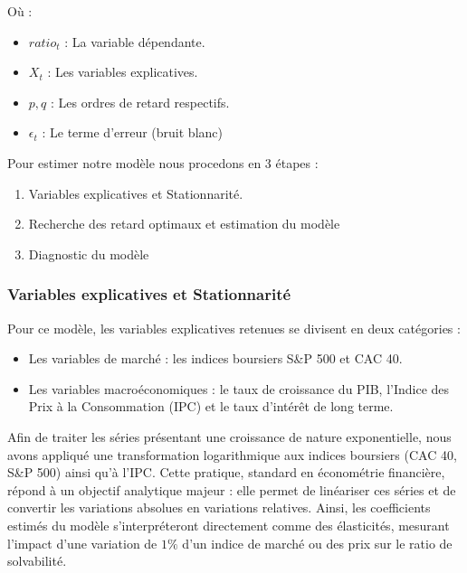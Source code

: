 \documentclass[
]{article}
\providecommand{\tightlist}{%
  \setlength{\itemsep}{0pt}\setlength{\parskip}{0pt}}
\begin{document}
Où :

\begin{itemize}
\tightlist
\item
  \(ratio_{t}\) : La variable dépendante.
\item
  \(X_{t}\) : Les variables explicatives.
\item
  \(p, q\) : Les ordres de retard respectifs.
\item
  \(\epsilon_{t}\) : Le terme d'erreur (bruit blanc)
\end{itemize}

Pour estimer notre modèle nous procedons en 3 étapes :

\begin{enumerate}
\def\labelenumi{\arabic{enumi}.}
\tightlist
\item
  Variables explicatives et Stationnarité.
\item
  Recherche des retard optimaux et estimation du modèle
\item
  Diagnostic du modèle
\end{enumerate}

\subsubsection{Variables explicatives et
Stationnarité}\label{variables-explicatives-et-stationnarituxe9}

Pour ce modèle, les variables explicatives retenues se divisent en deux
catégories :

\begin{itemize}
\tightlist
\item
  Les variables de marché : les indices boursiers S\&P 500 et CAC 40.
\item
  Les variables macroéconomiques : le taux de croissance du PIB,
  l'Indice des Prix à la Consommation (IPC) et le taux d'intérêt de long
  terme.
\end{itemize}

Afin de traiter les séries présentant une croissance de nature
exponentielle, nous avons appliqué une transformation logarithmique aux
indices boursiers (CAC 40, S\&P 500) ainsi qu'à l'IPC. Cette pratique,
standard en économétrie financière, répond à un objectif analytique
majeur : elle permet de linéariser ces séries et de convertir les
variations absolues en variations relatives. Ainsi, les coefficients
estimés du modèle s'interpréteront directement comme des élasticités,
mesurant l'impact d'une variation de \(1 \%\) d'un indice de marché ou
des prix sur le ratio de solvabilité.
\end{document}
